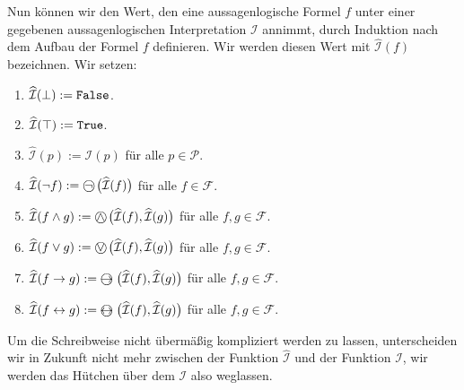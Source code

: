 \begin{table}[!ht]
  \centering
{}
  \caption{Interpretation der Junktoren}
  \label{tab:aussagen-logik}
\end{table}
Nun können wir den Wert, den eine aussagenlogische Formel $f$ unter einer gegebenen
aussagenlogischen Interpretation $\mathcal{I}$ annimmt, durch Induktion nach dem Aufbau
der Formel $f$ definieren.  Wir werden diesen Wert mit $\widehat{\mathcal{I}}(f)$
bezeichnen.  Wir setzen:
\begin{enumerate}
\item $\widehat{\mathcal{I}}(\bot) := \texttt{False}$.
\item $\widehat{\mathcal{I}}(\top) := \texttt{True}$.
\item $\widehat{\mathcal{I}}(p) := \mathcal{I}(p)$ für alle $p \in \mathcal{P}$.
\item $\widehat{\mathcal{I}}(\neg f) := \circneg\;\bigl(\widehat{\mathcal{I}}(f)\bigr)$ für alle $f \in \mathcal{F}$.
\item $\widehat{\mathcal{I}}(f \wedge g) := \circwedge\;\bigl(\widehat{\mathcal{I}}(f), \widehat{\mathcal{I}}(g)\bigr)$ 
      für alle $f, g \in \mathcal{F}$.
\item $\widehat{\mathcal{I}}(f \vee g) := \circvee\;\bigl(\widehat{\mathcal{I}}(f), \widehat{\mathcal{I}}(g)\bigr)$ 
      für alle $f, g \in \mathcal{F}$.
\item $\widehat{\mathcal{I}}(f \rightarrow g) := \circright\;\bigl(\widehat{\mathcal{I}}(f), \widehat{\mathcal{I}}(g)\bigr)$ 
      für alle $f, g \in \mathcal{F}$.
\item $\widehat{\mathcal{I}}(f \leftrightarrow g) := \circleftright\;\bigl(\widehat{\mathcal{I}}(f), \widehat{\mathcal{I}}(g)\bigr)$ 
      für alle $f, g \in \mathcal{F}$.
\end{enumerate}
Um die Schreibweise nicht übermäßig kompliziert werden zu lassen, unterscheiden wir in
Zukunft nicht  mehr zwischen der Funktion $\widehat{\mathcal{I}}$ und der Funktion $\mathcal{I}$, wir werden das Hütchen über dem
$\mathcal{I}$ also weglassen.

